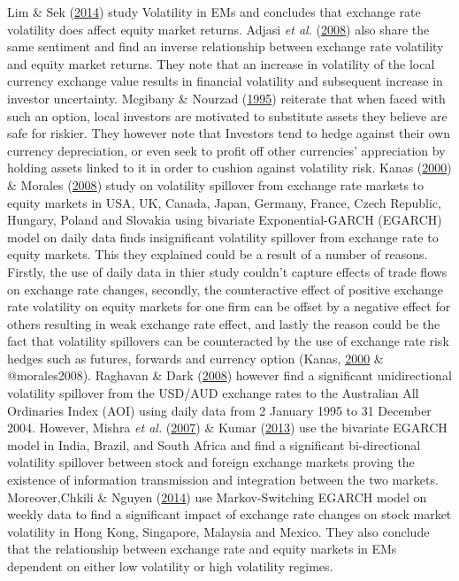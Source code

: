 \documentclass[11pt,preprint, authoryear]{elsarticle}
\numberwithin{equation}{section}
\numberwithin{figure}{section}
\numberwithin{table}{section}
\begin{document}
Lim \& Sek (\protect\hyperlink{ref-lim2014}{2014}) study Volatility in
EMs and concludes that exchange rate volatility does affect equity
market returns. Adjasi \emph{et al.}
(\protect\hyperlink{ref-adjasi2008}{2008}) also share the same sentiment
and find an inverse relationship between exchange rate volatility and
equity market returns. They note that an increase in volatility of the
local currency exchange value results in financial volatility and
subsequent increase in investor uncertainty. Mcgibany \& Nourzad
(\protect\hyperlink{ref-mcgibany1995}{1995}) reiterate that when faced
with such an option, local investors are motivated to substitute assets
they believe are safe for riskier. They however note that Investors tend
to hedge against their own currency depreciation, or even seek to profit
off other currencies' appreciation by holding assets linked to it in
order to cushion against volatility risk. Kanas
(\protect\hyperlink{ref-kanas2000}{2000}) \& Morales
(\protect\hyperlink{ref-morales2008}{2008}) study on volatility
spillover from exchange rate markets to equity markets in USA, UK,
Canada, Japan, Germany, France, Czech Republic, Hungary, Poland and
Slovakia using bivariate Exponential-GARCH (EGARCH) model on daily data
finds insignificant volatility spillover from exchange rate to equity
markets. This they explained could be a result of a number of reasons.
Firstly, the use of daily data in thier study couldn't capture effects
of trade flows on exchange rate changes, secondly, the counteractive
effect of positive exchange rate volatility on equity markets for one
firm can be offset by a negative effect for others resulting in weak
exchange rate effect, and lastly the reason could be the fact that
volatility spillovers can be counteracted by the use of exchange rate
risk hedges such as futures, forwards and currency option (Kanas,
\protect\hyperlink{ref-kanas2000}{2000} \& @morales2008). Raghavan \&
Dark (\protect\hyperlink{ref-raghavan2008}{2008}) however find a
significant unidirectional volatility spillover from the USD/AUD
exchange rates to the Australian All Ordinaries Index (AOI) using daily
data from 2 January 1995 to 31 December 2004. However, Mishra \emph{et
al.} (\protect\hyperlink{ref-mishra2007}{2007}) \& Kumar
(\protect\hyperlink{ref-kumar2013}{2013}) use the bivariate EGARCH model
in India, Brazil, and South Africa and find a significant bi-directional
volatility spillover between stock and foreign exchange markets proving
the existence of information transmission and integration between the
two markets. Moreover,Chkili \& Nguyen
(\protect\hyperlink{ref-chkili2014}{2014}) use Markov-Switching EGARCH
model on weekly data to find a significant impact of exchange rate
changes on stock market volatility in Hong Kong, Singapore, Malaysia and
Mexico. They also conclude that the relationship between exchange rate
and equity markets in EMs dependent on either low volatility or high
volatility regimes.
\end{document}
